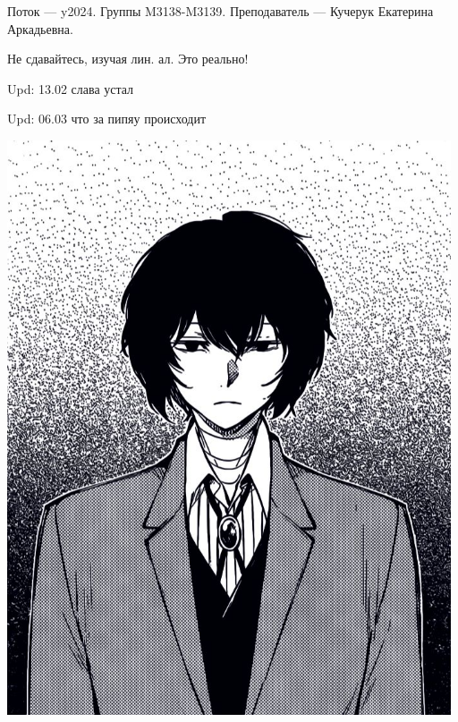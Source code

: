 Поток — y2024.\newline
Группы M3138-M3139.\newline
Преподаватель --- Кучерук Екатерина Аркадьевна.\par

Не сдавайтесь, изучая лин. ал. Это реально!

Upd: 13.02 слава устал

Upd: 06.03 что за пипяу происходит 
\begin{center}
   \includegraphics[height=17cm]{assets/dazai.jpg}
\end{center}